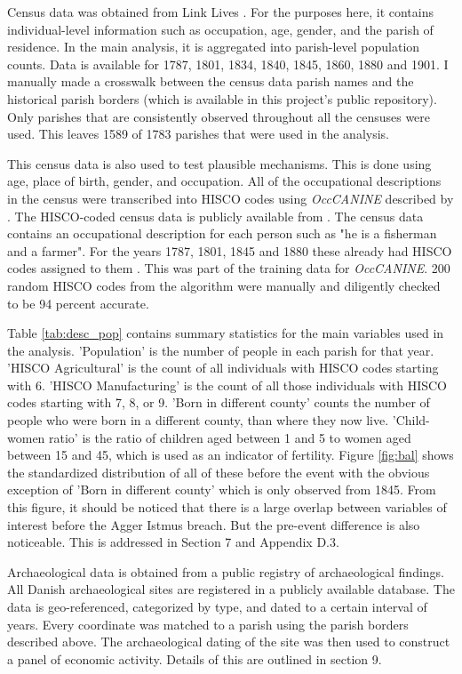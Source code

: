 \documentclass[11pt]{article}
\begin{document}
Census data was obtained from Link Lives \citep{mathiesen2022linklives}. For the purposes here, it contains individual-level information such as occupation, age, gender, and the parish of residence. In the main analysis, it is aggregated into parish-level population counts. Data is available for 1787, 1801, 1834, 1840, 1845, 1860, 1880 and 1901. I manually made a crosswalk between the census data parish names and the historical parish borders (which is available in this project's public repository). Only parishes that are consistently observed throughout all the censuses were used. This leaves 1589 of 1783 parishes that were used in the analysis. 

This census data is also used to test plausible mechanisms. This is done using age, place of birth, gender, and occupation. All of the occupational descriptions in the census were transcribed into HISCO codes using \textit{OccCANINE} described by \cite{dahl2024breaking}. The HISCO-coded census data is publicly available from \cite{dk_hisco_data}. The census data contains an occupational description for each person such as "he is a fisherman and a farmer". For the years 1787, 1801, 1845 and 1880 these already had HISCO codes assigned to them \citep{ddd_method2015}. This was part of the training data for \textit{OccCANINE}. 200 random HISCO codes from the algorithm were manually and diligently checked to be 94 percent accurate. 

Table \ref{tab:desc_pop} contains summary statistics for the main variables used in the analysis. 'Population' is the number of people in each parish for that year. 'HISCO Agricultural' is the count of all individuals with HISCO codes starting with 6. 'HISCO Manufacturing' is the count of all those individuals with HISCO codes starting with 7, 8, or 9. 'Born in different county' counts the number of people who were born in a different county, than where they now live. 'Child-women ratio' is the ratio of children aged between 1 and 5 to women aged between 15 and 45, which is used as an indicator of fertility. Figure \ref{fig:bal} shows the standardized distribution of all of these before the event with the obvious exception of 'Born in different county' which is only observed from 1845. From this figure, it should be noticed that there is a large overlap between variables of interest before the Agger Istmus breach. But the pre-event difference is also noticeable. This is addressed in Section 7 and Appendix D.3. 

Archaeological data is obtained from a public registry of archaeological findings. All Danish archaeological sites are registered in a publicly available database. The data is geo-referenced, categorized by type, and dated to a certain interval of years. Every coordinate was matched to a parish using the parish borders described above. The archaeological dating of the site was then used to construct a panel of economic activity. Details of this are outlined in section 9.
\end{document}
